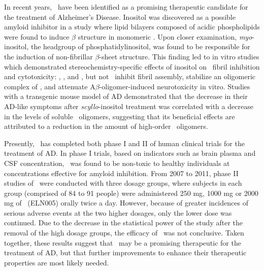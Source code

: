 In recent years, \scylloi\ have been identified as a promising therapeutic candidate for the treatment of Alzheimer's Disease. Inositol was discovered as a possible amyloid inhibitor in a study where lipid bilayers composed of acidic phospholipids were found to induce $\beta$ structure in monomeric .\cite{McLaurin:1996p584} Upon closer examination, \emph{myo}-inositol, the headgroup of phosphatidylinositol, was found to be responsible for the induction of non-fibrillar $\beta$-sheet structure.\cite{McLaurin:1998p3976, McLaurin:1998p3149} This finding led to in vitro studies which demonstrated stereochemistry-specific effects of inositol on \abeta\ fibril inhibition and cytotoxicity: \scyllo, \myo, and \epi, but not \chiroi\ inhibit  fibril assembly, stabilize an oligomeric complex of , and attenuate A$\beta$-oligomer-induced neurotoxicity in vitro.\cite{McLaurin:2000bq} Studies with a transgenic mouse model of AD demonstrated that the decrease in their AD-like symptoms after \emph{scyllo}-inositol treatment was correlated with a decrease in the levels of soluble \abeta\ oligomers, suggesting that its beneficial effects are attributed to a reduction in the amount of high-order \abeta\ oligomers.\cite{McLaurin:2006eb}


Presently, \scylloi\ has completed both phase I and II of human clinical trials for the treatment of AD.\cite{Salloway:2011im} In phase I trials, based on indicators such as brain plasma and CSF concentration, \scylloi\ was found to be non-toxic to healthy individuals at concentrations effective for amyloid inhibition. From 2007 to 2011, phase II studies of \scylloi\ were conducted with three dosage groups, where subjects in each group (comprised of 84 to 91 people) were administered 250 mg, 1000 mg or 2000 mg of \scylloi\ (ELN005) orally twice a day. However, because of greater incidences of serious adverse events at the two higher dosages, only the lower dose was continued. Due to the decrease in the statistical power of the study after the removal of the high dosage groups, the efficacy of \scylloi\ was not conclusive.\cite{Salloway:2011im} Taken together, these results suggest that \scylloi\ may be a promising therapeutic for the treatment of AD, but that further improvements to enhance their therapeutic properties are most likely needed.\cite{Nitz:2008jl,Sun:2008ko} %


